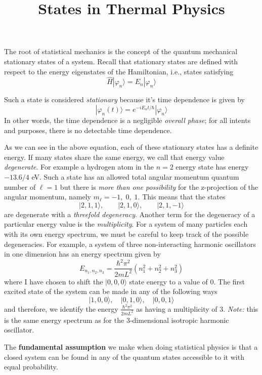 \documentclass{article}
\title{States in Thermal Physics}
\begin{document}
\maketitle
The root of statistical mechanics is the concept of the quantum mechanical
stationary states of a system. Recall that stationary states are defined with
respect to the energy eigenstates of the Hamiltonian, i.e., states satisfying
\begin{equation}
  \hat{H}|\varphi_n\rangle = E_n|\varphi_n\rangle
\end{equation}

Such a state is considered \textit{stationary} because it's time dependence is
given by
\begin{equation}
  |\varphi_n(t)\rangle = e^{-iE_n t/\hbar}|\varphi_n\rangle
\end{equation}
In other words, the time dependence is a negligible \textit{overall phase}; for
all intents and purposes, there is no detectable time dependence.

As we can see in the above equation, each of these stationary states has a
definite energy. If many states share the same energy, we call that
energy value \textit{degenerate}. For example a hydrogen atom in the $n=2$
energy state has energy $-13.6/4$ eV. Such a state has an allowed total angular
momentum quantum number of $\ell = 1$ but there is \textit{more than one
  possibility} for the z-projection of the angular momentum, namely $m_\ell =
-1, \; 0, \; 1$. This means that the states
\begin{equation}
  |2,1,1\rangle, \qquad |2,1,0\rangle, \qquad |2,1,-1\rangle
\end{equation}
are degenerate with a \textit{threefold degeneracy}. Another term for the
degeneracy of a particular energy value is the \textit{multiplicity}. For a
system of many particles each with its own energy spectrum, we must be careful
to keep track of the possible degeneracies. For example, a system of
three non-interacting harmonic oscillators in one dimension has an energy
spectrum given by
\begin{equation}
  E_{n_1,n_2,n_3} = \frac{\hbar^2\pi^2}{2mL^2}(n_1^2+n_2^2+n_3^2)
\end{equation}
where I have chosen to shift the $|0,0,0\rangle$ state energy to a value of $0$.
The first excited state of the system can be made in any of the following ways
\begin{equation}
  |1,0,0\rangle, \quad |0,1,0\rangle, \quad |0,0,1\rangle
\end{equation}
and therefore, we identify the energy $\frac{\hbar^2\pi^2}{2mL^2}$ as having a
multiplicity of $3$. \textit{Note:} this is the same energy spectrum as for the
3-dimensional isotropic harmonic oscillator.

The \textbf{fundamental assumption} we make when doing statistical physics is
that a closed system can be found in any of the quantum states accessible to it
with equal probability.
\end{document}
